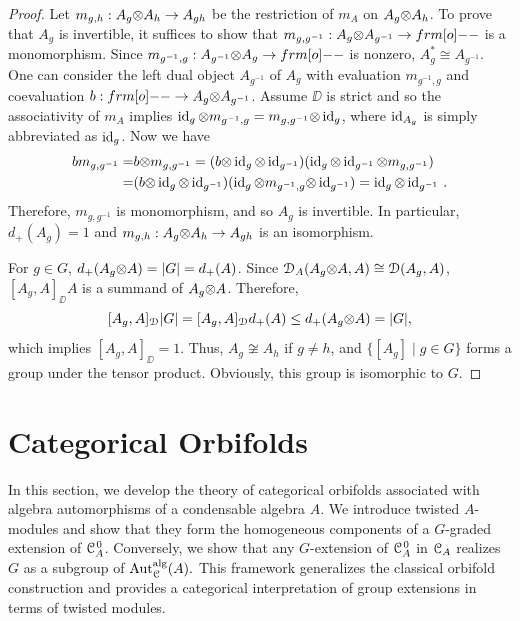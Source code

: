 \documentclass{amsart}
\begin{document}
\begin{proof}
Let $m_{g,h}: A_g {\otimes} A_h \to A_{gh}$ be the restriction of $m_A$ on $A_g {\otimes} A_h$. To prove that $A_g$ is invertible,  it suffices to show that $m_{g, g^{-1}}: A_g \o A_{g^{-1}}\to \1$ is a monomorphism. Since $m_{g^{-1}, g}: A_{g^{-1}} \o A_{g} \to \1$ is nonzero, $A_g^* \cong A_{g^{-1}}$. One can consider the left dual object $A_{g^{-1}}$ of $A_g$ with evaluation $m_{g^{-1}, g}$ and coevaluation $b: \1 \to A_g \o A_{g^{-1}}$.
Assume $\DD$ is strict and so the associativity of $m_A$ implies $\operatorname{id}_g {\otimes} m_{g^{-1}, g} = m_{g,g^{-1}} {\otimes} \operatorname{id}_g$, where $\operatorname{id}_{A_g}$ is simply abbreviated as $\operatorname{id}_g$.  Now we have
\begin{align*}
 b m_{g, g^{-1}}  = & b {\otimes} m_{g, g^{-1}}  = (b{\otimes} \operatorname{id}_g {\otimes} \operatorname{id}_{g^{-1}}) (\operatorname{id}_g {\otimes} \operatorname{id}_{g^{-1}} {\otimes} m_{g, g^{-1}} )\\
      =& (b{\otimes} \operatorname{id}_g {\otimes} \operatorname{id}_{g^{-1}}) (\operatorname{id}_g {\otimes} m_{g^{-1}, g} {\otimes} \operatorname{id}_{g^{-1}} ) =  \operatorname{id}_g {\otimes} \operatorname{id}_{g^{-1}}\,.
\end{align*}
Therefore, $m_{g, g^{-1}}$ is monomorphism, and so $A_g$ is invertible. In particular, $d_+(A_g) = 1$ and $m_{g,h}: A_g {\otimes} A_h \to A_{gh}$ is an isomorphism.

For $g \in G$, $d_+(A_g {\otimes} A) = |G| =d_+(A)$. Since ${\EuScript{D}}_A(A_g {\otimes} A, A) \cong {\EuScript{D}}(A_g, A)$, $[A_g,A]_\DD A$ is a summand of $A_g {\otimes} A$. Therefore, 
$$
[A_g,A]_{\EuScript{D}} |G| = [A_g, A]_{\EuScript{D}} d_+(A) \le d_+(A_g{\otimes} A) = |G|, 
$$
which implies $[A_g, A]_\DD = 1$. Thus, $A_g \not\cong A_h$ if $g \ne h$, and $\{[A_g] \mid g \in G\}$ forms a group under the tensor product. Obviously, this group is isomorphic to $G$.
\end{proof}

\section{Categorical Orbifolds} 

In this section, we develop the theory of categorical orbifolds associated with algebra automorphisms of a condensable algebra $A$. We introduce twisted $A$-modules and show that they form the homogeneous components of a $G$-graded extension of ${{\EuScript{C}}_A^{\hspace{1pt}0}}$. Conversely, we show that any $G$-extension of ${{\EuScript{C}}_A^{\hspace{1pt}0}}$ in ${{\EuScript{C}}_A}$  realizes $G$ as a subgroup of ${\operatorname{Aut}_{\EuScript{C}}^{\operatorname{alg}}}(A).$ This framework generalizes the classical orbifold construction and provides a categorical interpretation of group extensions in terms of twisted modules.
\end{document}
